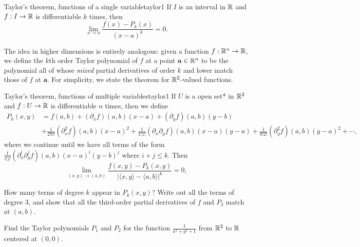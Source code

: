 \documentclass{watsonbook}
\begin{document}
  \begin{theo}{Taylor's theorem, functions of a single variable}{taylor1}
    If $I$ is an interval in $\mathbb{R}$ and $f: I \to \mathbb{R}$ is differentiable $k$ times, then
    \[
      \lim_{x\to a}\frac{f(x) - P_k(x)}{(x-a)^k} = 0. 
    \]
  \end{theo}
  
  The idea in higher dimensions is entirely analogous: given a
  function $f: \mathbb{R}^n \to \mathbb{R}$, we define the $k$th order Taylor
  polynomial of $f$ at a point $\mathbf{a} \in \mathbb{R}^n$ to be the
  polynomial all of whose \textit{mixed} partial derivatives of order
  $k$ and lower match those of $f$ at $\mathbf{a}$. For simplicity, we
  state the theorem for $\mathbb{R}^2$-valued functions. 

  \begin{theo}{Taylor's theorem, functions of multiple variables}{taylor1}
    If $U$ is a open set* in $\mathbb{R}^2$ and $f: U \to \mathbb{R}$ is differentiable $n$ times, then
    we define 
    \begin{align*}
      P_k(x,y) &= f(a,b) + (\partial_x f)(a,b)(x-a) +
      (\partial_y f)(a,b)(y-b) \\ &+ \frac{1}{2!0!}(\partial_x^2 f)(a,b)(x-a)^2 +
                                    \frac{1}{1!1!}(\partial_x\partial_y f)(a,b)(x-a)(y-a) +  \frac{1}{0!2!}(\partial_y^2
      f)(a,b)(y-a)^2 + \cdots, 
    \end{align*}
    where we continue until we have all terms of the form
    $\frac{1}{i!j!}(\partial_x^i\partial_y^j f)(a,b)(x-a)^i(y-b)^j$ where
    $i+j \leq k$. Then
    \[
      \lim_{(x,y) \to (a,b)}\frac{f(x,y) -
        P_k(x,y)}{|\langle x, y \rangle - \langle a,b \rangle|^k} = 0, 
    \]
  \end{theo}

  \begin{exercise}{}{}
    How many terms of degree $k$ appear in $P_k(x,y)$? Write out all
    the terms of degree 3, and show that all the third-order partial
    derivatives of $f$ and $P_3$ match at $(a,b)$.
  \end{exercise}

  \begin{exercise}{}{}
    Find the Taylor polynomials $P_1$ and $P_2$ for the function
    $\frac{1}{x^2 + y^2 + 1}$ from $\mathbb{R}^2$ to $\mathbb{R}$ centered at
    $(0,0)$. 
  \end{exercise}
  
\end{document}
